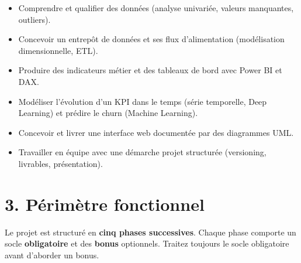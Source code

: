 \documentclass[11pt,a4paper]{article}
\providecommand{\tightlist}{\setlength{\itemsep}{0pt}\setlength{\parskip}{0pt}}
\begin{document}
\begin{itemize}
\tightlist
\item
  Comprendre et qualifier des données (analyse univariée, valeurs
  manquantes, outliers).
\item
  Concevoir un entrepôt de données et ses flux d'alimentation
  (modélisation dimensionnelle, ETL).
\item
  Produire des indicateurs métier et des tableaux de bord avec Power BI
  et DAX.
\item
  Modéliser l'évolution d'un KPI dans le temps (série temporelle, Deep
  Learning) et prédire le churn (Machine Learning).
\item
  Concevoir et livrer une interface web documentée par des diagrammes
  UML.
\item
  Travailler en équipe avec une démarche projet structurée (versioning,
  livrables, présentation).
\end{itemize}

\section{3. Périmètre fonctionnel}\label{puxe9rimuxe8tre-fonctionnel}

Le projet est structuré en \textbf{cinq phases successives}. Chaque
phase comporte un socle \textbf{obligatoire} et des \textbf{bonus}
optionnels. Traitez toujours le socle obligatoire avant d'aborder un
bonus.
\end{document}
